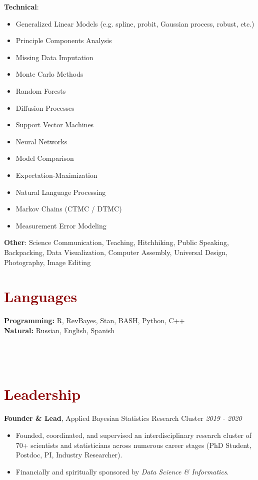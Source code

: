 \documentclass[11pt,margin,line]{resume}
\begin{document}
\begin{resume}
\textbf{Technical}:\vspace{-4.5mm}
\begin{multicols}{2}
    \begin{itemize}
    \setlength\itemsep{-0.2em}
         \item Generalized Linear Models (e.g. spline, probit, Gaussian process, robust, etc.)
         \item Principle Components Analysis
         \item Missing Data Imputation
	\item Monte Carlo Methods
         \item Random Forests
	\item Diffusion Processes
         \item Support Vector Machines
         \item Neural Networks
	\item Model Comparison
	\item Expectation-Maximization
	\item Natural Language Processing
	\item Markov Chains (CTMC / DTMC)
	\item Measurement Error Modeling
    \end{itemize}
    \end{multicols}\vspace{-4.5mm}
\textbf{Other}: Science Communication, Teaching, Hitchhiking, Public Speaking, Backpacking, Data Visualization, Computer Assembly, Universal Design, Photography, Image Editing 

\section{\large\textcolor{DarkRed}{Languages}}

\textbf{Programming:} R, RevBayes, Stan, BASH, Python, C++\\
\textbf{Natural:} Russian, English, Spanish\\\\\\\\


\section{\large\textcolor{DarkRed}{Leadership}}

\textbf{Founder \& Lead}, Applied Bayesian Statistics Research Cluster \hfill \emph{2019 - 2020}
\begin{itemize}[noitemsep]
\item Founded, coordinated, and supervised an interdisciplinary research cluster of 70+ scientists and statisticians across numerous career stages (PhD Student, Postdoc, PI, Industry Researcher). \item Financially and spiritually sponsored by \emph{Data Science \& Informatics}.
\end{itemize} 


\end{resume}
\end{document}
